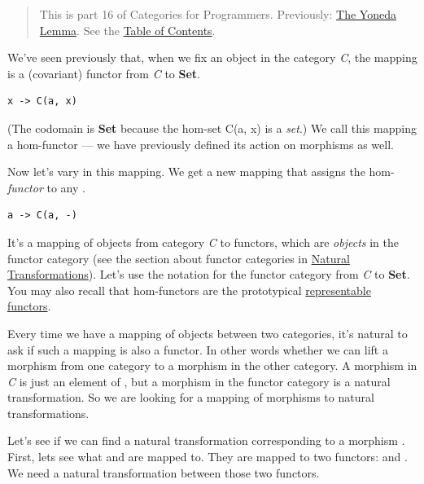 \begin{quote}
This is part 16 of Categories for Programmers. Previously:
\href{https://bartoszmilewski.com/2015/09/01/the-yoneda-lemma/}{The
Yoneda Lemma}. See the
\href{https://bartoszmilewski.com/2014/10/28/category-theory-for-programmers-the-preface/}{Table
of Contents}.
\end{quote}

We've seen previously that, when we fix an object  in the
category \emph{C}, the mapping  is a (covariant)
functor from \emph{C} to \textbf{Set}.

\begin{verbatim}
x -> C(a, x)
\end{verbatim}

(The codomain is \textbf{Set} because the hom-set C(a, x) is a
\emph{set}.) We call this mapping a hom-functor --- we have previously
defined its action on morphisms as well.

Now let's vary  in this mapping. We get a new mapping that
assigns the hom-\emph{functor}  to any .

\begin{verbatim}
a -> C(a, -)
\end{verbatim}

It's a mapping of objects from category \emph{C} to functors, which are
\emph{objects} in the functor category (see the section about functor
categories in
\href{https://bartoszmilewski.com/2015/04/07/natural-transformations/}{Natural
Transformations}). Let's use the notation \code{{[}C,\ Set{]}} for the
functor category from \emph{C} to \textbf{Set}. You may also recall that
hom-functors are the prototypical
\href{https://bartoszmilewski.com/2015/07/29/representable-functors/}{representable
functors}.

Every time we have a mapping of objects between two categories, it's
natural to ask if such a mapping is also a functor. In other words
whether we can lift a morphism from one category to a morphism in the
other category. A morphism in \emph{C} is just an element of
, but a morphism in the functor category
\code{{[}C,\ Set{]}} is a natural transformation. So we are looking
for a mapping of morphisms to natural transformations.

Let's see if we can find a natural transformation corresponding to a
morphism . First, lets see what
 and  are mapped to. They are mapped to two
functors:  and . We need a natural
transformation between those two functors.


